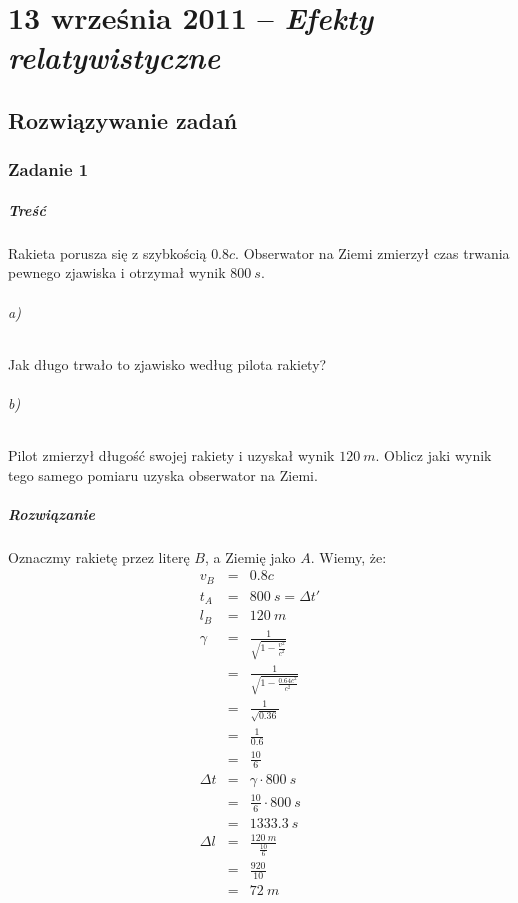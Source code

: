 \documentclass [a4paper, 11pt, oneside]{book}
\begin{document}
\chapter{13 września 2011 -- \textit{Efekty relatywistyczne}} %
\label{cha:13_wrze_nia_2011_textit_efekty_relatywistyczne}
	\section{Rozwiązywanie zadań} %
	\label{sec:rozwi_zywanie_zada_}
		\subsection{Zadanie 1} %
		\label{sub:zadanie_1}
			\paragraph{Treść}
			Rakieta porusza się z szybkością $0.8c$. Obserwator na Ziemi zmierzył czas trwania pewnego zjawiska i otrzymał wynik $800~s$.
				\subparagraph{a)}Jak długo trwało to zjawisko według pilota rakiety?
				\subparagraph{b)}Pilot zmierzył długość swojej rakiety i uzyskał wynik $120~m$. Oblicz jaki wynik tego samego pomiaru uzyska obserwator na Ziemi.
			\paragraph{Rozwiązanie}
			Oznaczmy rakietę przez literę $B$, a Ziemię jako $A$. Wiemy, że:
			\begin{eqnarray*}
				v_B &=& 0.8c\\
				t_A & = & 800~s = \Delta t'\\
				l_B & = & 120~m\\
				\gamma &=& \frac{1}{\sqrt{1-\frac{v^2}{c^2}}}\\
				&=&\frac{1}{\sqrt{1-\frac{0.64c^2}{c^2}}}\\
				&=&\frac{1}{\sqrt{0.36}}\\
				&=&\frac{1}{0.6}\\
				&=&\frac{10}{6}\\
				\Delta t &=& \gamma\cdot800~s\\
				& = & \frac{10}{6}\cdot800~s\\
				&=& 1333.3~s\\
				\Delta l &= & \frac{120~m}{\frac{10}6}\\
				&=& \frac{920}{10}\\
				&=&72~m
			\end{eqnarray*}
\end{document}
